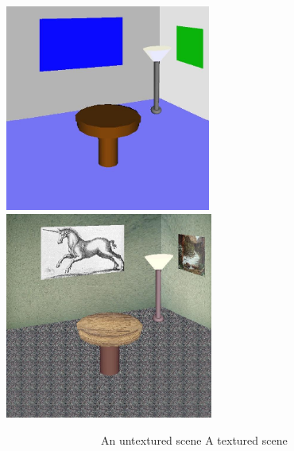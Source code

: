 \documentclass[letterpaper]{article}
\begin{document}
{\bigskip


 \includegraphics[width=2.6543in,height=2.6693in]{utr9/utr9-img032.jpg}
  \ \ \ \ \ \ \ \ \ \ \ \ \
\includegraphics[width=2.6846in,height=2.6693in]{utr9/utr9-img033.jpg}

\ \ \ \ \ \ \ \ \ \ \ \ \ \ \ \ \ 
An untextured scene \hfill A textured scene
\ \ \ \ \ \ \ \ \ \ \ \ \ \ \ \ \ 


\bigskip

}
\end{document}

